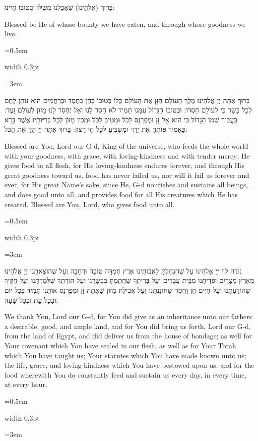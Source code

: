 \documentclass[11pt, openany]{book}
\newlength{\bidiHebWidth}
\newlength{\bidiEngWidth}
\newenvironment{bilingual}{%
  \par\vspace{4pt}%
}{%
  \noindent
  \begin{minipage}[t]{\bidiEngWidth}
    \setstretch{1.4}\emergencystretch=0.5em\normalsize
    \usebox{\bidiEngBox}
  \end{minipage}%
  \hfill
  {\color{sedergold}\vrule width 0.3pt}%
  \hfill
  \begin{minipage}[t]{\bidiHebWidth}
    \begingroup\hebrewfont\TeXXeTstate=1\beginR
    \large\setstretch{1.4}\emergencystretch=3em\tolerance=9999\parindent=0pt\relax
    \usebox{\bidiHebBox}
    \endR\endgroup
  \end{minipage}%
  \par\vspace{2pt}%
}
\newenvironment{hebrewcol}{%
  \begin{lrbox}{\bidiHebBox}\begin{minipage}{\bidiHebWidth}%
}{%
  \end{minipage}\end{lrbox}%
}
\newenvironment{englishcol}{%
  \begin{lrbox}{\bidiEngBox}\begin{minipage}{\bidiEngWidth}%
}{%
  \end{minipage}\end{lrbox}%
}
\begin{document}
\begin{bilingual}
\begin{hebrewcol}
בָּרוּךְ (אֱלֹהֵינוּ) שֶׁאָכַלְנוּ מִשֶּׁלּוֹ וּבְטוּבוֹ חָיִינוּ:
\end{hebrewcol}
\begin{englishcol}
Blessed be He of whose bounty we have eaten, and through whose goodness we live.
\end{englishcol}
\end{bilingual}
\begin{bilingual}
\begin{hebrewcol}
בָּרוּךְ אַתָּה יְיָ אֱלֹהֵינוּ מֶלֶךְ הָעוֹלָם הַזָּן אֶת הָעוֹלָם כֻּלּוֹ בְּטוּבוֹ בְּחֵן בְּחֶסֶד וּבְרַחֲמִים הוּא נוֹתֵן לֶחֶם לְכָל בָּשָׂר כִּי לְעוֹלָם חַסְדּוֹ: וּבְטוּבוֹ הַגָּדוֹל עִמָּנוּ תָּמִיד לֹא חָסֵר לָנוּ וְאַל יֶחְסַר לָנוּ מָזוֹן לְעוֹלָם וָעֶד: בַּעֲבוּר שְׁמוֹ הַגָּדוֹל כִּי הוּא אֵל זָן וּמְפַרְנֵס לַכֹּל וּמֵטִיב לַכֹּל וּמֵכִין מָזוֹן לְכָל בְּרִיּוֹתָיו אֲשֶׁר בָּרָא כָּאָמוּר פּוֹתֵחַ אֶת יָדֶךָ וּמַשְׂבִּיעַ לְכָל חַי רָצוֹן: בָּרוּךְ אַתָּה יְיָ הַזָּן אֶת הַכֹּל:
\end{hebrewcol}
\begin{englishcol}
Blessed are You, Lord our G-d, King of the universe, who feeds the whole world with your goodness, with grace, with loving-kindness and with tender mercy; He gives food to all flesh, for His loving-kindness endures forever, and through His great goodness toward us, food has never failed us, nor will it fail us forever and ever, for His great Name's sake, since He, G-d nourishes and sustains all beings, and does good unto all, and provides food for all His creatures which He has created. Blessed are You, Lord, who gives food unto all.
\end{englishcol}
\end{bilingual}
\begin{bilingual}
\begin{hebrewcol}
נוֹדֶה לְּךָ יְיָ אֱלֹהֵינוּ עַל שֶׁהִנְחַלְתָּ לַאֲבוֹתֵינוּ אֶרֶץ חֶמְדָּה טוֹבָה וּרְחָבָה וְעַל שֶׁהוֹצֵאתָנוּ יְיָ אֱלֹהֵינוּ מֵאֶרֶץ מִצְרַיִם וּפְדִיתָנוּ מִבֵּית עֲבָדִים וְעַל בְּרִיתְךָ שֶׁחָתַמְתָּ בִּבְשָׂרֵנוּ וְעַל תּוֹרָתְךָ שֶׁלִּמַּדְתָּנוּ וְעַל חֻקֶּיךָ שֶׁהוֹדַעְתָּנוּ וְעַל חַיִּים חֵן וָחֶסֶד שֶׁחוֹנַנְתָּנוּ וְעַל אֲכִילַת מָזוֹן שָׁאַתָּה זָן וּמְפַרְנֵס אוֹתָנוּ תָּמִיד בְּכָל יוֹם וּבְכָל עֵת וּבְכָל שָׁעָה:
\end{hebrewcol}
\begin{englishcol}
We thank You, Lord our G-d, for You did give as an inheritance unto our fathers a desirable, good, and ample land, and for You did bring us forth, Lord our G-d, from the land of Egypt, and did deliver us from the house of bondage; as well for Your covenant which You have sealed in our flesh; as well as for Your Torah which You have taught us; Your statutes which You have made known unto us; the life, grace, and loving-kindness which You have bestowed upon us; and for the food wherewith You do constantly feed and sustain us every day, in every time, at every hour.
\end{englishcol}
\end{bilingual}
\end{document}
